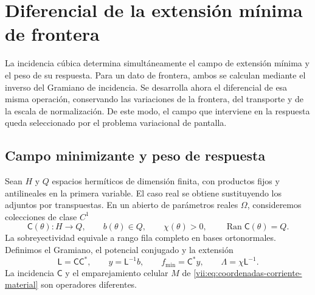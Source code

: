 
\section{Diferencial de la extensión mínima de frontera}
\label{vii:sec:corriente-extension-minima}

La incidencia cúbica determina simultáneamente el campo de extensión
mínima y el peso de su respuesta. Para un dato de frontera, ambos se
calculan mediante el inverso del Gramiano de incidencia. Se desarrolla
ahora el diferencial de esa misma operación, conservando las variaciones
de la frontera, del transporte y de la escala de normalización. De este
modo, el campo que interviene en la respuesta queda seleccionado por
el problema variacional de pantalla.

\subsection{Campo minimizante y peso de respuesta}
\label{vii:subsec:extension-minima-parametrizada}

Sean \(H\) y \(Q\) espacios hermíticos de dimensión finita, con
productos fijos y antilineales en la primera variable. El caso real se
obtiene sustituyendo los adjuntos por transpuestas. En un abierto de
parámetros reales \(\Omega\), consideremos colecciones de clase \(C^1\)
\[
 \mathsf C(\theta):H\longrightarrow Q,\qquad
 b(\theta)\in Q,\qquad \chi(\theta)>0,
 \qquad \operatorname{Ran}\mathsf C(\theta)=Q.
\]
La sobreyectividad equivale a rango fila completo en bases ortonormales.
Definimos el Gramiano, el potencial conjugado y la extensión
\begin{equation}
 \mathsf L=\mathsf C\mathsf C^*,\qquad
 y=\mathsf L^{-1}b,\qquad f_{\min}=\mathsf C^*y,
 \qquad \Lambda=\chi\mathsf L^{-1}.
 \label{vii:eq:gramiano-extension-minima}
\end{equation}
La incidencia \(\mathsf C\) y el emparejamiento celular \(M\) de
\eqref{vii:eq:coordenadas-corriente-material} son operadores diferentes.

